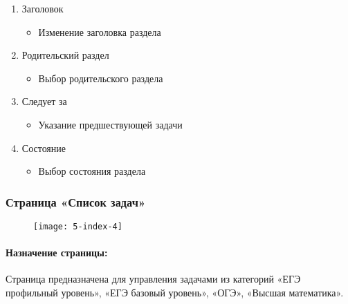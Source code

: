 \begin{enumerate}
\begin{enumerate}
\begin{enumerate}
			\item Заголовок
			\begin{itemize}
				\item Изменение заголовка раздела
			\end{itemize}

			\item Родительский раздел
			\begin{itemize}
				\item Выбор родительского раздела
			\end{itemize}

			\item Следует за
			\begin{itemize}
				\item Указание предшествующей задачи
			\end{itemize}

			\item Состояние
			\begin{itemize}
				\item Выбор состояния раздела
			\end{itemize}

		\end{enumerate}
	\end{enumerate}
\end{enumerate}

\subsubsection{Страница «Список задач»}
\begin{figure}[H]
\texttt{[image: 5-index-4]}
\end{figure}
\paragraph{Назначение страницы:} Страница предназначена для управления задачами из категорий «ЕГЭ профильный уровень», «ЕГЭ базовый уровень», «ОГЭ», «Высшая математика».

